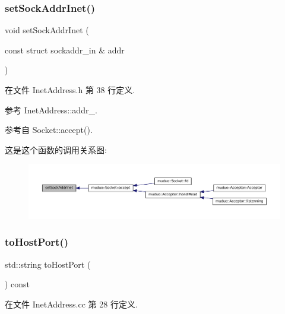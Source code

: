 \subsubsection{\texorpdfstring{set\+Sock\+Addr\+Inet()}{setSockAddrInet()}}
{\footnotesize\ttfamily void set\+Sock\+Addr\+Inet (\begin{DoxyParamCaption}\item[{const struct sockaddr\+\_\+in \&}]{addr }\end{DoxyParamCaption})\hspace{0.3cm}{\ttfamily [inline]}}



在文件 Inet\+Address.\+h 第 38 行定义.



参考 Inet\+Address\+::addr\+\_\+.



参考自 Socket\+::accept().

这是这个函数的调用关系图\+:
\nopagebreak
\begin{figure}[H]
\begin{center}
\leavevmode
\includegraphics[width=350pt]{classmuduo_1_1InetAddress_ac40372dd403192210eddb5e699a420c7_icgraph}
\end{center}
\end{figure}
\mbox{\label{classmuduo_1_1InetAddress_afe6339cb39e2b7972bccd0f1418a062c}} 
\subsubsection{\texorpdfstring{to\+Host\+Port()}{toHostPort()}}
{\footnotesize\ttfamily std\+::string to\+Host\+Port (\begin{DoxyParamCaption}{ }\end{DoxyParamCaption}) const}



在文件 Inet\+Address.\+cc 第 28 行定义.



